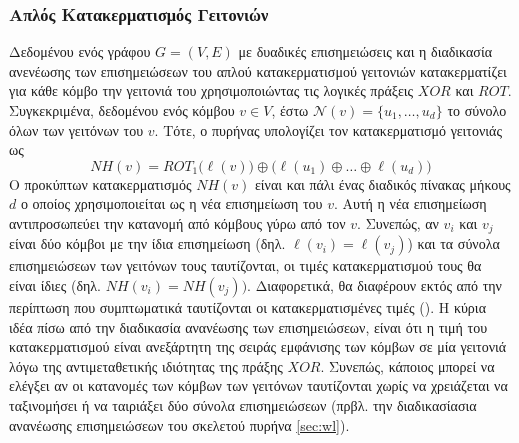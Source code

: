 \subsubsection{Απλός Κατακερματισμός Γειτονιών}
Δεδομένου ενός γράφου $G=(V,E)$ με δυαδικές επισημειώσεις και η διαδικασία ανενέωσης των επισημειώσεων του απλού κατακερματισμού γειτονιών κατακερματίζει για κάθε κόμβο την γειτονιά του χρησιμοποιώντας τις λογικές πράξεις $XOR$ και $ROT$.
Συγκεκριμένα, δεδομένου ενός κόμβου $v \in V$, έστω $\mathcal{N}(v)=\{ u_1,\ldots,u_d \}$ το σύνολο όλων των γειτόνων του $v$.
Τότε, ο πυρήνας υπολογίζει τον κατακερματισμό γειτονιάς ως
\begin{equation*}
    NH(v) = ROT_1 \big( \ell(v) \big) \oplus \big( \ell(u_1) \oplus \ldots \oplus \ell(u_d) \big)
\end{equation*}
Ο προκύπτων κατακερματισμός $NH(v)$ είναι και πάλι ένας διαδικός πίνακας μήκους $d$ ο οποίος χρησιμοποιείται ως η νέα επισημείωση του $v$.
Αυτή η νέα επισημείωση αντιπροσωπεύει την κατανομή από κόμβους γύρω από τον $v$.
Συνεπώς, αν $v_i$ και $v_j$ είναι δύο κόμβοι με την ίδια επισημείωση (δηλ. $\ell(v_i) = \ell(v_j)$) και τα σύνολα επισημειώσεων των γειτόνων τους ταυτίζονται, οι τιμές κατακερματισμού τους θα είναι ίδιες (δηλ. $NH(v_i) = NH(v_j))$.
Διαφορετικά, θα διαφέρουν εκτός από την περίπτωση που συμπτωματικά ταυτίζονται οι κατακερματισμένες τιμές ().
Η κύρια ιδέα πίσω από την διαδικασία ανανέωσης των επισημειώσεων, είναι ότι η τιμή του κατακερματισμού είναι ανεξάρτητη της σειράς εμφάνισης των κόμβων σε μία γειτονιά λόγω της αντιμεταθετικής ιδιότητας της πράξης $XOR$.
Συνεπώς, κάποιος μπορεί να ελέγξει αν οι κατανομές των κόμβων των γειτόνων ταυτίζονται χωρίς να χρειάζεται να ταξινομήσει ή να ταιριάξει δύο σύνολα επισημειώσεων (πρβλ. την διαδικασίασια ανανέωσης επισημειώσεων του σκελετού πυρήνα  \ref{sec:wl}).


